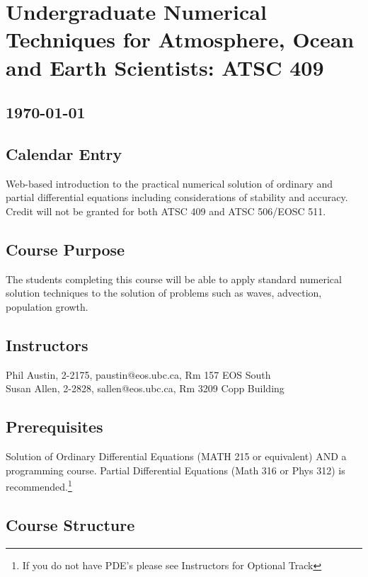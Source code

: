 \documentclass[11pt]{article}
\begin{document}
\section*{Undergraduate Numerical Techniques for Atmosphere, Ocean and Earth Scientists: ATSC 409}
\subsection*{\center\today}

\subsection*{Calendar Entry}

Web-based introduction to the practical numerical solution of ordinary and partial
differential equations including considerations of stability and accuracy.  Credit
will not be granted for both ATSC 409 and ATSC 506/EOSC 511.

\subsection*{Course Purpose}

The students completing this course will be able to apply standard numerical solution techniques to the solution of problems such as waves, advection, population growth.

\subsection*{Instructors}

       Phil Austin, 2-2175, paustin@eos.ubc.ca, Rm 157 EOS South \\
       Susan Allen, 2-2828, sallen@eos.ubc.ca, Rm 3209 Copp Building


\subsection*{Prerequisites}

Solution of Ordinary Differential Equations (MATH 215 or equivalent)  AND a programming course.  Partial Differential Equations (Math 316 or Phys 312) is recommended.\footnote{If you do not have PDE's please see Instructors for Optional Track}

\subsection*{Course Structure}
\end{document}
